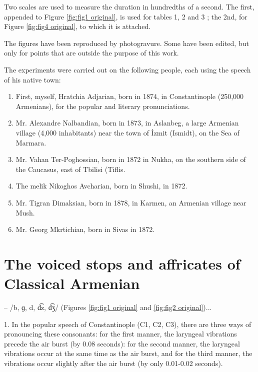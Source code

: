 Two scales are used to measure the duration in hundredths of a second. The first, appended to Figure \ref{fig:fig1 original}, is used for tables 1, 2 and 3 ; the 2nd, for Figure \ref{fig:fig4 original}, to which it is attached.

The figures have been reproduced by photogravure. Some have been edited, but only for points that are outside the purpose of this work.

The experiments were carried out on the following people, each using the speech of his native town:

\begin{enumerate}
	\item First, myself, Hratchia Adjarian, born in 1874, in Constantinople (250,000 Armenians), for the popular and literary pronunciations.
	\item Mr. Alexandre Nalbandian, born in 1873, in Aslanbeg, a large Armenian village (4,000 inhabitants) near the town of İzmit (Ismidt), on the Sea of Marmara.
	
	\item Mr. Vahan Ter-Poghossian, born in 1872 in Nukha, on the southern side of the Caucasus, east of Tbilisi (Tiflis.
	
	\item The melik Nikoghos Avcharian, born in Shushi, in 1872.
	
	\item Mr. Tigran Dimaksian, born in 1878, in Karmen, an Armenian village near Mush.
	
	\item Mr. Georg Mkrtichian, born in Sivas in 1872.
	
\end{enumerate}


\section{The voiced stops and affricates of Classical Armenian}

 – /b, ɡ, d,  d͡z,  d͡ʒ/ (Figures \ref{fig:fig1 original} and \ref{fig:fig2 original})... 

1. In the popular speech of Constantinople (C1, C2, C3), there are three ways of pronouncing these consonants: for the first manner, the laryngeal vibrations precede the air burst (by 0.08 seconds): for the second manner, the laryngeal vibrations occur at the same time as the air burst, and for the third manner, the vibrations occur slightly after the air burst (by only 0.01-0.02 seconds).

